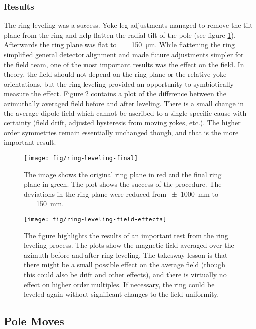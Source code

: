 \subsubsection{Results}
The ring leveling was a success.  Yoke leg adjustments managed to remove the tilt plane from the ring and help flatten the radial tilt of the pole (see figure \ref{fig:ring-leveling-final}).  Afterwards the ring plane was flat to \SI{\pm 150}{\micro\meter}.  While flattening the ring simplified general \mugmtwo detector alignment and made future adjustments simpler for the field team, one of the most important results was the effect on the field.  In theory, the field should not depend on the ring plane or the relative yoke orientations, but the ring leveling provided an opportunity to symbiotically measure the effect.  Figure \ref{fig:ring-leveling-field-effects} contains a plot of the difference between the azimuthally averaged field before and after leveling.  There is a small change in the average dipole field which cannot be ascribed to a single specific cause with certainty (field drift, adjusted hysteresis from moving yokes, etc.).  The higher order symmetries remain essentially unchanged though, and that is the more important result.

\begin{figure}
\centering
\texttt{[image: fig/ring-leveling-final]}
\caption{
    The image shows the original ring plane in red and the final ring plane in green.  The plot shows the success of the procedure.  The deviations in the ring plane were reduced from \SI{\pm 1000}{\mm} to \SI{\pm 150}{\mm}. 
    \label{fig:ring-leveling-final}
}
\end{figure}

\begin{figure}
\centering
\texttt{[image: fig/ring-leveling-field-effects]}
\caption{
    The figure highlights the results of an important test from the ring leveling process.  The plots show the magnetic field averaged over the azimuth before and after ring leveling.  The takeaway lesson is that there might be a small possible effect on the average field (though this could also be drift and other effects), and there is virtually no effect on higher order multiples.  If necessary, the ring could be leveled again without significant changes to the field uniformity. 
    \label{fig:ring-leveling-field-effects}
}
\end{figure}

\subsection{Pole Moves}

